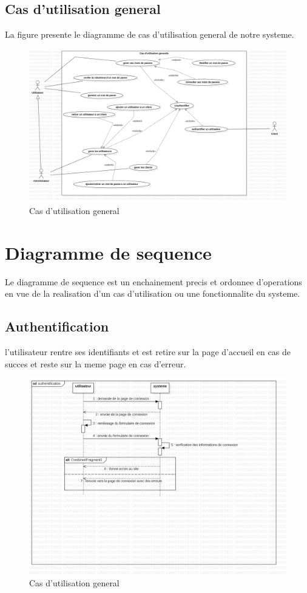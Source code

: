 \documentclass[11pt,a4paper]{report}
\begin{document}
 \subsection{Cas d'utilisation general}
 La figure presente le diagramme de cas d'utilisation general de notre systeme.
 \begin{center}
 \begin{figure}[!h]
 \includegraphics[scale=0.2]{img/casutilisationgeneral}
 \caption{Cas d'utilisation general}
 \end{figure}
 \end{center}
 \section{Diagramme de sequence}
 Le diagramme de sequence est un enchainement precis et ordonnee d'operations en vue de la realisation d'un cas d'utilisation ou une fonctionnalite du systeme.
 \subsection{Authentification}
 l'utilisateur rentre ses identifiants et est retire sur la page d'accueil en cas de succes et reste sur la meme page en cas d'erreur. 
 \begin{center}
 \begin{figure}[!h]
 \includegraphics[scale=0.2]{img/authentification_seq}
 \caption{Cas d'utilisation general}
 \end{figure}
 \end{center}
\end{document}
